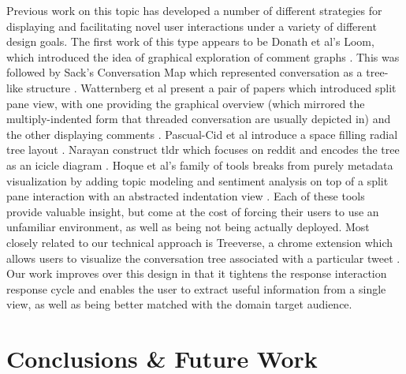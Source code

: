 \documentclass{egpubl}
\begin{document}
 Previous work on this topic has developed a number of different strategies for displaying and facilitating novel user interactions under a variety of different design goals.
 The first work of this type appears to be Donath et al's Loom, which introduced the idea of graphical exploration of comment graphs \cite{donath1999visualizing}. 
 This was followed by Sack's Conversation Map which represented conversation as a tree-like structure \cite{sack2000conversation}. 
 Watternberg et al present a pair of papers which introduced split pane view, with one providing the graphical overview (which mirrored the multiply-indented form that threaded conversation are usually depicted in) and the other displaying comments \cite{wattenberg2003conversation, dave2004flash}.
% 
Pascual-Cid et al introduce a space filling radial tree layout \cite{pascual2009exploring}. 
%
Narayan construct tldr which focuses on reddit and encodes the tree as an icicle diagram \cite{narayan2010not}. 
%
Hoque et al's family of tools breaks from purely metadata visualization by adding topic modeling and sentiment analysis on top of a split pane interaction with an abstracted indentation view \cite{hoque2014convis, hoque2016interactive}.
%
Each of these tools provide valuable insight, but come at the cost of forcing their users to use an unfamiliar environment, as well as being not being actually deployed.
%
Most closely related to our technical approach is Treeverse, a chrome extension which allows users to visualize the conversation tree associated with a particular tweet \cite{treeverse}.
%
 Our work improves over this design in that it tightens the response interaction response cycle and enables the user to extract useful information from a single view, as well as being better matched with the domain target audience.


\section{Conclusions \& Future Work}
\end{document}
